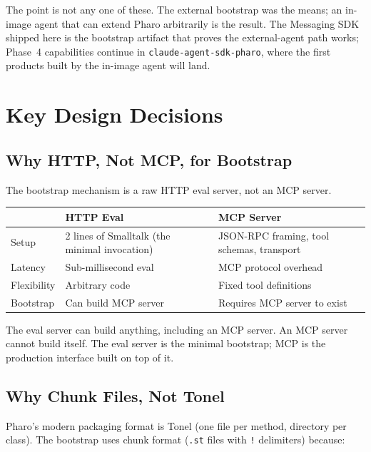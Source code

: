 \documentclass[a4paper,10pt,fleqn]{article}
\begin{document}
The point is not any one of these.  The external bootstrap was the
means; an in-image agent that can extend Pharo arbitrarily is the
result.  The Messaging SDK shipped here is the bootstrap artifact
that proves the external-agent path works; Phase~4 capabilities
continue in \texttt{claude-agent-sdk-pharo}, where the first
products built by the in-image agent will land.

\section{Key Design Decisions}

\subsection{Why HTTP, Not MCP, for Bootstrap}

The bootstrap mechanism is a raw HTTP eval server, not an MCP server.

\begin{center}
\begin{tabularx}{\linewidth}{@{}lYY@{}}
\toprule
& \textbf{HTTP Eval} & \textbf{MCP Server} \\
\midrule
Setup       & 2 lines of Smalltalk (the minimal invocation) & JSON-RPC framing, tool schemas, transport \\
Latency     & Sub-millisecond eval & MCP protocol overhead \\
Flexibility & Arbitrary code       & Fixed tool definitions \\
Bootstrap   & Can build MCP server & Requires MCP server to exist \\
\bottomrule
\end{tabularx}
\end{center}

The eval server can build anything, including an MCP server.  An MCP
server cannot build itself.  The eval server is the minimal bootstrap;
MCP is the production interface built on top of it.

\subsection{Why Chunk Files, Not Tonel}

Pharo's modern packaging format is Tonel (one file per method, directory
per class).  The bootstrap uses chunk format (\texttt{.st} files with
\texttt{!} delimiters) because:
\end{document}
